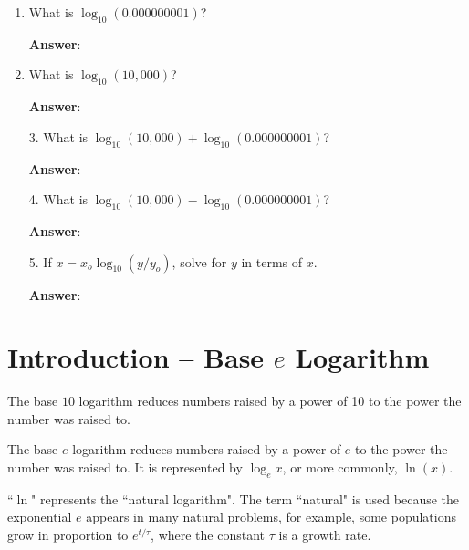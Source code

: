 \documentclass{article}
\begin{document}
\begin{enumerate}

  \item What is $\log_{10}(0.000000001)$?

        \ifsolutions
        \textbf{Answer}:
        \else
        \vskip 24pt
        \fi

  \item What is $\log_{10}(10,000)$?

        \ifsolutions
        \textbf{Answer}:
        \else
        \vskip 24pt
        \fi

\end{enumerate}

\begin{enumerate}

  \item[3.] What is $\log_{10}(10,000)+\log_{10}(0.000000001)$?

            \ifsolutions
            \textbf{Answer}:
            \else
            \vskip 24pt
            \fi

  \item[4.] What is $\log_{10}(10,000)-\log_{10}(0.000000001)$?

            \ifsolutions
            \textbf{Answer}:
            \else
            \vskip 24pt
            \fi

  \item[5.] If $x = x_o\log_{10}(y/y_o)$, solve for $y$ in terms of $x$.

            \ifsolutions
            \textbf{Answer}:
            \else
            \vskip 24pt
            \fi

\end{enumerate}

\section{Introduction -- Base $e$ Logarithm}

The base $10$ logarithm reduces numbers raised by a power of 10 to the power the number was raised to.

The base $e$ logarithm reduces numbers raised by a power of $e$ to the power the number was raised to. It is represented by $\log_{e}x$, or more commonly, $\ln(x)$.

``$\ln$" represents the ``natural logarithm". The term ``natural" is used because the exponential $e$ appears in many natural problems, for example, some populations grow in proportion to $e^{t/\tau}$, where the constant $\tau$ is a growth rate.
\end{document}
